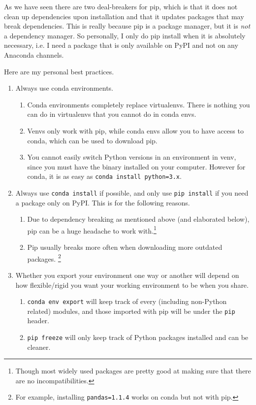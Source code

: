   As we have seen there are two deal-breakers for pip, which is that it does not clean up dependencies upon installation and that it updates packages that may break dependencies. This is really because pip is a package manager, but it is \textit{not} a dependency manager. So personally, I only do pip install when it is absolutely necessary, i.e. I need a package that is only available on PyPI and not on any Anaconda channels. 

  \begin{theorem}
    Here are my personal best practices. 
    \begin{enumerate}
      \item Always use conda environments. 
        \begin{enumerate}
          \item Conda environments completely replace virtualenvs. There is nothing you can do in virtualenvs that you cannot do in conda envs. 
          \item Venvs only work with pip, while conda envs allow you to have access to conda, which can be used to download pip. 
          \item You cannot easily switch Python versions in an environment in venv, since you must have the binary installed on your computer. However for conda, it is as easy as \texttt{conda install python=3.x}. 
        \end{enumerate}
      \item Always use \texttt{conda install} if possible, and only use \texttt{pip install} if you need a package only on PyPI. This is for the following reasons. 
        \begin{enumerate}
          \item Due to dependency breaking as mentioned above (and elaborated below), pip can be a huge headache to work with.\footnote{Though most widely used packages are pretty good at making sure that there are no incompatibilities.} 
          \item Pip usually breaks more often when downloading more outdated packages. \footnote{For example, installing \texttt{pandas=1.1.4} works on conda but not with pip. }
        \end{enumerate}

        \item Whether you export your environment one way or another will depend on how flexible/rigid you want your working environment to be when you share. 
          \begin{enumerate}
            \item \texttt{conda env export} will keep track of every (including non-Python related) modules, and those imported with pip will be under the \texttt{pip} header. 
            \item \texttt{pip freeze} will only keep track of Python packages installed and can be cleaner. 
          \end{enumerate}
    \end{enumerate}
  \end{theorem}

